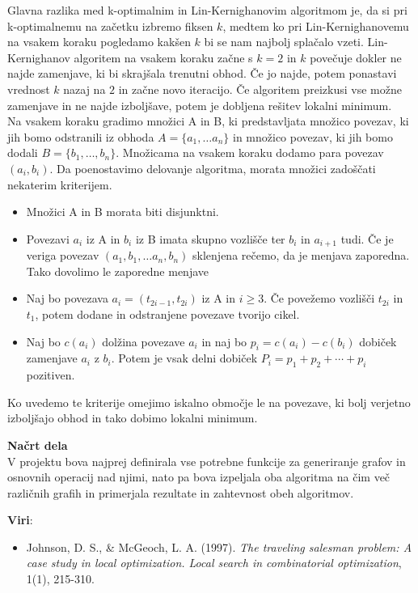 \documentclass[a4paper,12pt]{article}
\begin{document}
Glavna razlika med k-optimalnim in Lin-Kernighanovim algoritmom je, da si pri k-optimalnemu na začetku izbremo fiksen $k$, medtem ko pri Lin-Kernighanovemu na vsakem koraku pogledamo kakšen $k$ bi se nam najbolj splačalo vzeti. Lin-Kernighanov algoritem na vsakem koraku začne s $k=2$ in $k$ povečuje dokler ne najde zamenjave, ki bi skrajšala trenutni obhod. Če jo najde, potem ponastavi vrednost $k$ nazaj na $2$ in začne novo iteracijo. Če algoritem preizkusi vse možne zamenjave in ne najde izboljšave, potem je dobljena rešitev lokalni minimum. \\

Na vsakem koraku gradimo množici A in B, ki predstavljata množico povezav, ki jih bomo odstranili iz obhoda $A=\{a_1, \dots a_n\}$ in množico povezav, ki jih bomo dodali $B=\{b_1, \dots, b_n\}$. Množicama na vsakem koraku dodamo para povezav$(a_i, b_i)$. Da poenostavimo delovanje algoritma, morata množici zadoščati nekaterim kriterijem. 
\begin{itemize}

\item Množici A in B morata biti disjunktni.  
\item Povezavi $a_i$ iz A in $b_i$ iz B imata skupno vozlišče ter $b_i$ in  $a_{i+1}$ tudi. Če je veriga povezav $(a_1, b_1,\dots a_n, b_n)$ sklenjena rečemo, da je menjava zaporedna. Tako dovolimo le zaporedne menjave
\item Naj bo povezava $a_i = (t_{2i-1}, t_{2i})$  iz A in $i\ge 3$. Če povežemo vozlišči $t_{2i}$ in $t_1$, potem dodane in odstranjene povezave tvorijo cikel.
\item Naj bo $c(a_i)$ dolžina povezave $a_i$ in naj bo $p_i = c(a_i) - c(b_i)$ dobiček zamenjave $a_i$ z $b_i$. Potem je vsak delni dobiček $P_i = p_1 + p_2 + \cdots + p_i$ pozitiven.

\end{itemize}

Ko uvedemo te kriterije omejimo iskalno območje le na povezave, ki bolj verjetno izboljšajo obhod in tako dobimo lokalni minimum.

\vspace{5 mm}
\textbf{Načrt dela}\\

V projektu bova najprej definirala vse potrebne funkcije za generiranje grafov in osnovnih operacij nad njimi, nato pa bova izpeljala oba algoritma na čim več različnih grafih in primerjala rezultate in zahtevnost obeh algoritmov.

\vspace{5 mm}
\textbf{Viri}:

\begin{itemize}
\item Johnson, D. S., \& McGeoch, L. A. (1997). \textit{The traveling salesman problem: A case study in local optimization. Local search in combinatorial optimization}, 1(1), 215-310.
\end{itemize}
\end{document}
